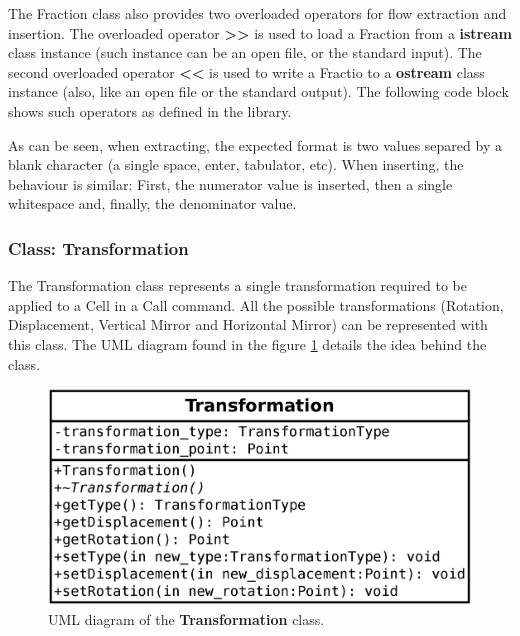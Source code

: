 \documentclass[11pt,twoside,openany,x11names,svgnames]{memoir}
\begin{document}
The Fraction class also provides two overloaded operators for flow extraction and insertion. The overloaded operator \textbf{>>} is used to load a Fraction from a \textbf{istream} class instance (such instance can be an open file, or the standard input). The second overloaded operator \textbf{<<} is used to write a Fractio to a \textbf{ostream} class instance (also, like an open file or the standard output). The following code block shows such operators as defined in the library.



As can be seen, when extracting, the expected format is two values separed by a blank character (a single space, enter, tabulator, etc). When inserting, the behaviour is similar: First, the numerator value is inserted, then a single whitespace and, finally, the denominator value.

\subsubsection{Class: Transformation}\label{Class-Transformation}

The Transformation class represents a single transformation required to be applied to a Cell in a Call command. All the possible transformations (Rotation, Displacement, Vertical Mirror and Horizontal Mirror) can be represented with this class. The UML diagram found in the figure \ref{fig:class-transformation} details the idea behind the class.

\begin{figure}
	\centering
	\includegraphics[scale=0.2, clip=true, trim= 0pt 0pt 0pt 0pt]{images/chapter03-image15}
	\caption{UML diagram of the \textbf{Transformation} class.}
	\label{fig:class-transformation}
\end{figure}
\end{document}
